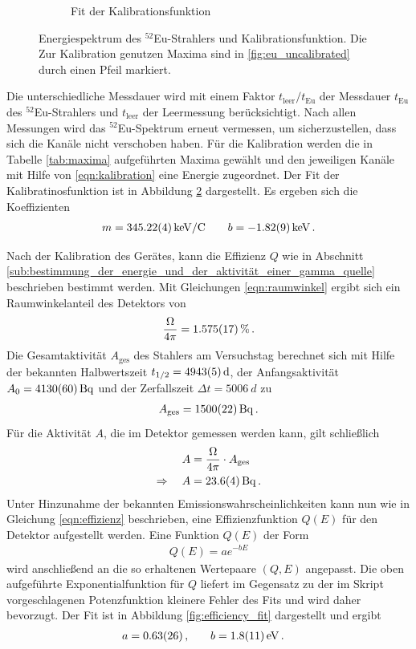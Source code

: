 \begin{figure}[htb]
\begin{subfigure}{.49\linewidth}
        \caption{
            Fit der Kalibrationsfunktion
        }
        \label{fig:calibration}
    \end{subfigure}
    \caption{
        Energiespektrum des $^{52}$Eu-Strahlers und Kalibrationsfunktion. Die Zur Kalibration genutzen Maxima sind in \ref{fig:eu_uncalibrated} durch einen Pfeil markiert.
    }
\end{figure}
Die unterschiedliche Messdauer wird mit einem Faktor $t_\text{leer} / t_\text{Eu}$ der Messdauer $t_\text{Eu}$ des $^{52}$Eu-Strahlers und $t_\text{leer}$ der Leermessung berücksichtigt.
Nach allen Messungen wird das $^52$Eu-Spektrum erneut vermessen, um sicherzustellen, dass sich die Kanäle nicht verschoben haben.
Für die Kalibration werden die in Tabelle \ref{tab:maxima} aufgeführten Maxima gewählt und den jeweiligen Kanäle mit Hilfe von \eqref{eqn:kalibration} eine Energie zugeordnet. Der Fit der Kalibratinosfunktion ist in Abbildung \ref{fig:calibration} dargestellt.
Es ergeben sich die Koeffizienten
%
\begin{align*}
     m = \SI{345.22+-0.04}{keV/C} \qquad b = \SI{-1.82+-0.09}{keV} \,.
\end{align*}

Nach der Kalibration des Gerätes, kann die Effizienz $Q$ wie in Abschnitt \ref{sub:bestimmung_der_energie_und_der_aktivität_einer_gamma_quelle} beschrieben bestimmt werden. Mit Gleichungen \eqref{eqn:raumwinkel} ergibt sich ein Raumwinkelanteil des Detektors von
\begin{align*}
    \frac{\Omega}{4\pi} = \SI{1.575+-0.017}{\percent}\,.
\end{align*}
Die Gesamtaktivität $A_\text{ges}$ des Stahlers am Versuchstag berechnet sich mit Hilfe der bekannten Halbwertszeit $t_{1/2} = \SI{4943+-5}{d}$, der Anfangsaktivität $A_0 = \SI{4130+-60}{\becquerel}$ und der Zerfallszeit $\Delta t = \SI{5006}{d}$ zu
\begin{align*}
    A_\text{ges} = \SI{1500+-22}{\becquerel}\,.
\end{align*}
Für die Aktivität $A$, die im Detektor gemessen werden kann, gilt schließlich
\begin{align*}
    A &= \frac{\Omega}{4\pi}\cdot A_\text{ges}\,\\
    \Rightarrow \quad A &= \SI{23.6+-0.4}{\becquerel}\,.
\end{align*}
Unter Hinzunahme der bekannten Emissionswahrscheinlichkeiten kann nun wie in Gleichung \eqref{eqn:effizienz} beschrieben, eine Effizienzfunktion $Q(E)$ für den Detektor aufgestellt werden.
Eine Funktion $Q(E)$ der Form
\begin{align*}
    Q(E) = ae^{-bE}
\end{align*}
wird anschließend an die so erhaltenen Wertepaare $(Q,E)$ angepasst. Die oben aufgeführte Exponentialfunktion für $Q$ liefert im Gegensatz zu der im Skript vorgeschlagenen Potenzfunktion kleinere Fehler des Fits und wird daher bevorzugt. Der Fit ist in Abbildung \ref{fig:efficiency_fit} dargestellt und ergibt
\begin{align*}
    a &= \num{0.63+-0.26}\,, &\quad b &= \SI[per-mode=fraction]{1.8+-1.1}{\per eV}\,.
\end{align*}

